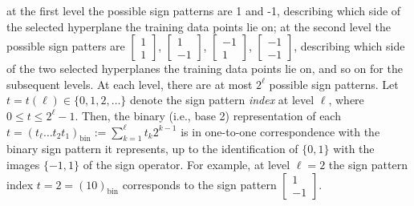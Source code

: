 \documentclass[twoside,11pt]{article}
\newcommand{\edit}[1]{{{#1}}}
\begin{document}
at the first \edit{level} the possible sign patterns are 1 and -1, describing which side of the selected hyperplane the training data points lie on; at the second \edit{level} the possible sign patters are $\begin{bmatrix} 1 \\ 1 \end{bmatrix}$, $\begin{bmatrix} 1 \\ -1 \end{bmatrix}$, $\begin{bmatrix} -1 \\ 1 \end{bmatrix}$, $\begin{bmatrix} -1 \\ -1 \end{bmatrix}$, describing which side of the two selected hyperplanes the training data points lie on, and so on for the subsequent \edit{level}s. \edit{At each level, there are at most $2^\ell$ possible sign patterns. Let $t = t(\ell)\in\{0,1,2,\dots\}$ denote the sign pattern \textit{index} at level $\ell$, where $0\leq t \leq 2^\ell-1$. Then, the binary (i.e., base 2) representation of each $t = (t_\ell \dots t_2 t_1)_{\mbox{bin}} := \sum_{k=1}^\ell t_k 2^{k-1}$ is in one-to-one correspondence with the binary sign pattern it represents, up to the identification of $\{0,1\}$ with the images $\{-1,1\}$ of the sign operator. For example, at level $\ell=2$ the sign pattern index $t=2 = (10)_{\mbox{bin}}$ corresponds to the sign pattern $\begin{bmatrix} 1 \\ -1 \end{bmatrix}$.}
\end{document}
